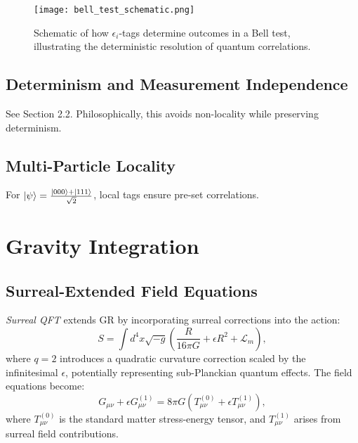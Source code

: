 \documentclass{article}
\begin{document}
\begin{figure}[h]
    \centering
    \texttt{[image: bell\_test\_schematic.png]}
    \caption{Schematic of how \(\epsilon_i\)-tags determine outcomes in a Bell test, illustrating the deterministic resolution of quantum correlations.}
    \label{fig:bell_test}
\end{figure}

\subsection{Determinism and Measurement Independence}
See Section 2.2. Philosophically, this avoids non-locality while preserving determinism.

\subsection{Multi-Particle Locality}
For \(\ket{\psi} = \frac{\ket{000} + \ket{111}}{\sqrt{2}}\), local tags ensure pre-set correlations.

\section{Gravity Integration}
\subsection{Surreal-Extended Field Equations}
\textit{Surreal QFT} extends GR by incorporating surreal corrections into the action:
\begin{equation}
S = \int d^4x \sqrt{-g} \left( \frac{R}{16\pi G} + \epsilon R^2 + \mathcal{L}_m \right),
\end{equation}
where \( q = 2 \) introduces a quadratic curvature correction scaled by the infinitesimal \(\epsilon\), potentially representing sub-Planckian quantum effects. The field equations become:
\begin{equation}
G_{\mu\nu} + \epsilon G_{\mu\nu}^{(1)} = 8\pi G \left( T_{\mu\nu}^{(0)} + \epsilon T_{\mu\nu}^{(1)} \right),
\end{equation}
where \( T_{\mu\nu}^{(0)} \) is the standard matter stress-energy tensor, and \( T_{\mu\nu}^{(1)} \) arises from surreal field contributions.
\end{document}
